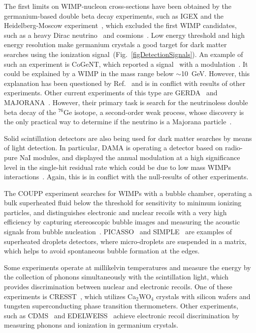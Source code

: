 The first limits on WIMP-nucleon cross-sections have been obtained by the germanium-based double beta decay experiments, such as IGEX and the Heidelberg-Moscow experiment~\cite{FirstLimits_1, FirstLimits_2}, which excluded the first WIMP candidates, such as a heavy Dirac neutrino~\cite{DiracNeutrino} and cosmions~\cite{FirstLimits_Cosmions}. Low energy threshold and high energy resolution make germanium crystals a good target for dark matter searches using the ionization signal~(Fig.~\ref{figDetectionSignals}). 
An example of such an experiment is CoGeNT, which reported a signal~\cite{CoGeNT_LightWIMP} with a modulation~\cite{CoGeNT_modulation}. It could be explained by a WIMP in the mass range below $\sim$10~GeV. However, this explanation has been questioned by Ref.~\cite{Schwetz} and is in conflict with results of other experiments. Other current experiments of this type are GERDA~\cite{GERDA} and MAJORANA~\cite{MAJORANA}. 
However, their primary task is search for the neutrinoless double beta decay of the $^{76}$Ge isotope, a second-order weak process, whose discovery is the only practical way to determine if the neutrino is a Majorana particle~\cite{DoubleBetaGe76}.

Solid scintillation detectors are also being used for dark matter searches by means of light detection. In particular, DAMA is operating a detector based on radio-pure NaI modules, and displayed the annual modulation at a high significance level in the single-hit residual rate which could be due to low mass WIMPs interactions~\cite{DAMA}. Again, this is in conflict with the null-results of other experiments.

The COUPP experiment searches for WIMPs with a bubble chamber, operating a bulk superheated fluid  below the threshold for sensitivity to minimum ionizing particles, and distinguishes electronic and nuclear recoils with a very high efficiency by capturing stereoscopic bubble images and measuring the acoustic signals from bubble nucleation~\cite{COUPP}. PICASSO~\cite{PICASSO} and SIMPLE~\cite{SIMPLE} are examples of superheated droplets detectors, where micro-droplets are suspended in a matrix, which helps to avoid spontaneous bubble formation at the edges.

Some experiments operate at millikelvin temperatures and measure the energy by the collection of phonons simultaneously with the scintillation light, which provides discrimination between nuclear and electronic recoils. One of these experiments is CRESST~\cite{CRESST}, which utilizes Ca$_{2}$WO$_{4}$ crystals with silicon wafers and tungsten superconducting phase transition  thermometers. 
Other experiments, such as CDMS~\cite{CDMS_limit} and EDELWEISS~\cite{EDELWEISS_limit} achieve electronic recoil discrimination by measuring phonons and ionization in germanium crystals.

